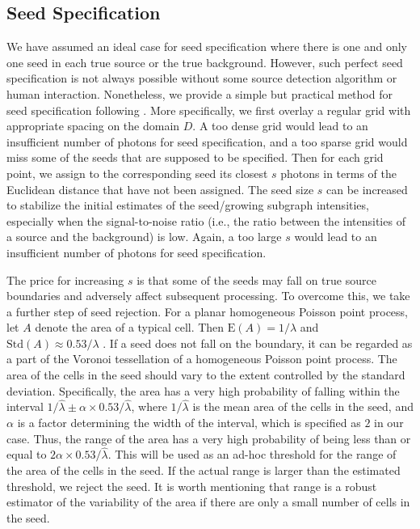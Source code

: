 \documentclass{aastex61}
\begin{document}
\subsection{Seed Specification}\label{sec:seed_spec}
We have assumed an ideal case for seed specification where there is one and only one seed in each true source or the true background. However, such perfect seed specification is not always possible without some source detection algorithm or human interaction. Nonetheless, we provide a simple but practical method for seed specification following \citet{Lee-00}. More specifically, we first overlay a regular grid with appropriate spacing on the domain $D$. A too dense grid would lead to an insufficient number of photons for seed specification, and a too sparse grid would miss some of the seeds that are supposed to be specified. Then for each grid point, we assign to the corresponding seed its closest $s$ photons in terms of the Euclidean distance that have not been assigned. The seed size $s$ can be increased to stabilize the initial estimates of the seed/growing subgraph intensities, especially when the signal-to-noise ratio (i.e., the ratio between the intensities of a source and the background) is low. Again, a too large $s$ would lead to an insufficient number of photons for seed specification.

The price for increasing $s$ is that some of the seeds may fall on true source boundaries and adversely affect subsequent processing. To overcome this, we take a further step of seed rejection. For a planar homogeneous Poisson point process, let $A$ denote the area of a typical cell.
Then $\mbox{E}(A)=1/\lambda$ and $\mbox{Std}(A)\approx 0.53/\lambda$ \citep[Chapter 4.2]{Moller-94}. If a seed does not fall on the boundary, it can be regarded as a part of the Voronoi tessellation of a homogeneous Poisson point process. The area 
of the cells in the seed should vary to the extent controlled by the standard deviation. Specifically, the area has a very high probability of falling within the interval $1/\hat{\lambda}\pm\alpha \times 0.53/\hat{\lambda}$, 
where $1/\hat{\lambda}$ is the mean area of the cells in the seed, and $\alpha$ is a factor determining the width of the interval, which is specified as $2$ in our case.
Thus, the range of the area has a very high probability of being less than or equal to $2\alpha \times 0.53/\hat{\lambda}$. This will be used as an ad-hoc threshold for the range of the area of the cells in the seed. If the actual range is larger than the estimated threshold, we reject the seed. It is worth mentioning that range is a robust estimator of the variability of the area if there are only a small number of cells in the seed.
\end{document}
